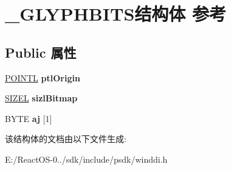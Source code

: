 \hypertarget{struct___g_l_y_p_h_b_i_t_s}{}\section{\+\_\+\+G\+L\+Y\+P\+H\+B\+I\+T\+S结构体 参考}
\label{struct___g_l_y_p_h_b_i_t_s}
\subsection*{Public 属性}
\begin{DoxyCompactItemize}
\item 
\mbox{\label{struct___g_l_y_p_h_b_i_t_s_a2cc7a9896508e65916c1fd33aba5188c}} 
\hyperlink{struct___p_o_i_n_t_l}{P\+O\+I\+N\+TL} {\bfseries ptl\+Origin}
\item 
\mbox{\label{struct___g_l_y_p_h_b_i_t_s_acd829328bd396ee0fb6ef078ceb317ef}} 
\hyperlink{structtag_s_i_z_e}{S\+I\+Z\+EL} {\bfseries sizl\+Bitmap}
\item 
\mbox{\label{struct___g_l_y_p_h_b_i_t_s_ab86116cc3a54d88f915cd2ecb23ea857}} 
B\+Y\+TE {\bfseries aj} \mbox{[}1\mbox{]}
\end{DoxyCompactItemize}


该结构体的文档由以下文件生成\+:\begin{DoxyCompactItemize}
\item 
E\+:/\+React\+O\+S-\/0../sdk/include/psdk/winddi.\+h\end{DoxyCompactItemize}
